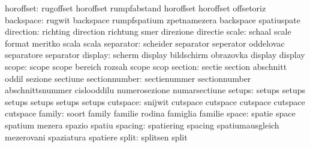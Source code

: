                 horoffset: rugoffset                 horoffset
                           rumpfabstand              horoffset
                           horoffset                 offsetoriz %
                backspace: rugwit                    backspace
                           rumpfspatium              zpetnamezera
                           backspace                 spatiuspate %
                direction: richting                  direction
                           richtung                  smer
                           direzione                 directie
                    scale: schaal                    scale
                           format                    meritko
                           scala                     scala
                separator: scheider                  separator
                           seperator                 oddelovac
                           separatore                separator
                  display: scherm                    display
                           bildschirm                obrazovka
                           display                   display %
                    scope: scope                     scope
                           bereich                   rozsah
                           scope                     scop %
                  section: sectie                    section
                           abschnitt                 oddil
                           sezione                   sectiune
            sectionnumber: sectienummer              sectionnumber
                           abschnittsnummer          cislooddilu
                           numerosezione             numarsectiune
setups: setups setups
        setups setups
        setups setups
                 cutspace: snijwit                   cutspace
                           cutspace                  cutspace
                           cutspace                  cutspace %
                   family: soort                     family
                           familie                   rodina
                           famiglia                  familie
                    space: spatie                    space
                           spatium                   mezera
                           spazio                    spatiu
                  spacing: spatiering                spacing
                           spatiumausgleich          mezerovani
                           spaziatura                spatiere
                    split: splitsen                  split

